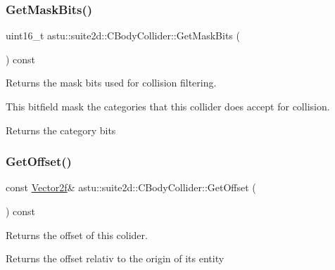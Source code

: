 \subsubsection{\texorpdfstring{Get\+Mask\+Bits()}{GetMaskBits()}}
{\footnotesize\ttfamily uint16\+\_\+t astu\+::suite2d\+::\+C\+Body\+Collider\+::\+Get\+Mask\+Bits (\begin{DoxyParamCaption}{ }\end{DoxyParamCaption}) const\hspace{0.3cm}{\ttfamily [inline]}}

Returns the mask bits used for collision filtering.

This bitfield mask the categories that this collider does accept for collision.

\begin{DoxyReturn}{Returns}
the category bits 
\end{DoxyReturn}
\mbox{\label{classastu_1_1suite2d_1_1CBodyCollider_ad874702f1fd7b40e477916deb8f39289}} 
\subsubsection{\texorpdfstring{Get\+Offset()}{GetOffset()}}
{\footnotesize\ttfamily const \hyperlink{classastu_1_1Vector2}{Vector2f}\& astu\+::suite2d\+::\+C\+Body\+Collider\+::\+Get\+Offset (\begin{DoxyParamCaption}{ }\end{DoxyParamCaption}) const\hspace{0.3cm}{\ttfamily [inline]}}

Returns the offset of this colider.

\begin{DoxyReturn}{Returns}
the offset relativ to the origin of its entity 
\end{DoxyReturn}
\mbox{\label{classastu_1_1suite2d_1_1CBodyCollider_a3323f62162d237b44858fc1ee53fa5b1}} 
